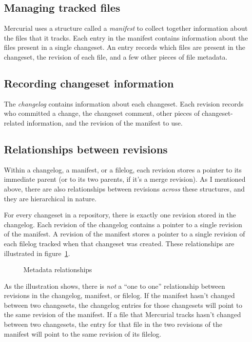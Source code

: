 \subsection{Managing tracked files}

Mercurial uses a structure called a \emph{manifest} to collect
together information about the files that it tracks.  Each entry in
the manifest contains information about the files present in a single
changeset.  An entry records which files are present in the changeset,
the revision of each file, and a few other pieces of file metadata.

\subsection{Recording changeset information}

The \emph{changelog} contains information about each changeset.  Each
revision records who committed a change, the changeset comment, other
pieces of changeset-related information, and the revision of the
manifest to use.

\subsection{Relationships between revisions}

Within a changelog, a manifest, or a filelog, each revision stores a
pointer to its immediate parent (or to its two parents, if it's a
merge revision).  As I mentioned above, there are also relationships
between revisions \emph{across} these structures, and they are
hierarchical in nature.

For every changeset in a repository, there is exactly one revision
stored in the changelog.  Each revision of the changelog contains a
pointer to a single revision of the manifest.  A revision of the
manifest stores a pointer to a single revision of each filelog tracked
when that changeset was created.  These relationships are illustrated
in figure~\ref{fig:concepts:metadata}.

\begin{figure}[ht]
  \centering
  \caption{Metadata relationships}
  \label{fig:concepts:metadata}
\end{figure}

As the illustration shows, there is \emph{not} a ``one to one''
relationship between revisions in the changelog, manifest, or filelog.
If the manifest hasn't changed between two changesets, the changelog
entries for those changesets will point to the same revision of the
manifest.  If a file that Mercurial tracks hasn't changed between two
changesets, the entry for that file in the two revisions of the
manifest will point to the same revision of its filelog.

